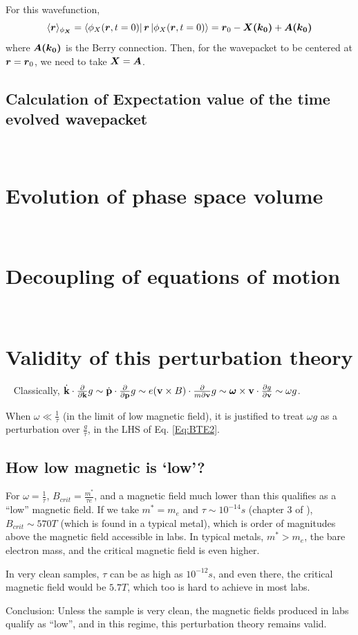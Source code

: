 \documentclass{revtex4-2}
\newcommand{\bvec}[1]{{\mathbf #1}}
\renewcommand\vec[1]{\ensuremath\boldsymbol{#1}} %
\begin{document}
For this wavefunction,
$$\langle \vec{r} \rangle_{\phi_{\vec{X}}} = \bra{\phi_X(\vec{r}, t=0)} \vec{r} \ket{\phi_X(\vec{r}, t=0)} = \vec{r}_0 - \vec{X(\vec{k}_0)} + \vec{A(\vec{k}_0)} $$
where  $\vec{A(\vec{k}_0)}$ is the Berry connection. Then, for the wavepacket to be centered at $\vec{r} = \vec{r}_0$, we need to take $\vec{X} = \vec{A}$.
\subsection{Calculation of Expectation value of the time evolved wavepacket}~\label{app:center-at-new-time}
\section{Evolution of phase space volume}~\label{app:phase-space-volume-evolution}

\section{Decoupling of equations of motion}~\label{app:decoupling-of-eom}
\section{Validity of this perturbation theory}~\label{app:perturbation_validation}
Classically, $\dot{\bvec{k}}\cdot\frac{\partial}{\partial \bvec{k}} g \sim \dot{\bvec{p}}\cdot\frac{\partial}{\partial \bvec{p}} g \sim e (\bvec{v}\times{B})\cdot\frac{\partial}{m\partial \bvec{v}} g \sim \vec{\omega} \times \bvec{v}\cdot \frac{\partial g}{\partial \bvec{v}} \sim \omega g$.

When $\omega \ll \frac{1}{\tau}$ (in the limit of low magnetic field), it is justified to treat $\omega g$ as a perturbation over $\frac{g}{\tau}$, in the LHS of Eq. \eqref{Eq:BTE2}.
\subsection{How low magnetic is `low'?}
For $\omega = \frac{1}{\tau}$, $B_{crit} = \frac{m^*}{\tau e}$, and a magnetic field much lower than this qualifies as a ``low'' magnetic field. If we take $m^* = m_e$ and $\tau \sim 10^{-14} s$ (chapter 3 of \cite{book:SimonSolidState}), $B_{crit} \sim 570 T$ (which is found in a typical metal), which is order of magnitudes above the magnetic field accessible in labs. In typical metals, $m^* > m_e$, the bare electron mass, and the critical magnetic field is even higher.

In very clean samples, $\tau$ can be as high as $10^{-12} s$, and even there, the critical magnetic field would be  $5.7 T$, which too is hard to achieve in most labs.

Conclusion: Unless the sample is very clean, the magnetic fields produced in labs qualify as ``low'', and in this regime, this perturbation theory remains valid.


\end{document}
